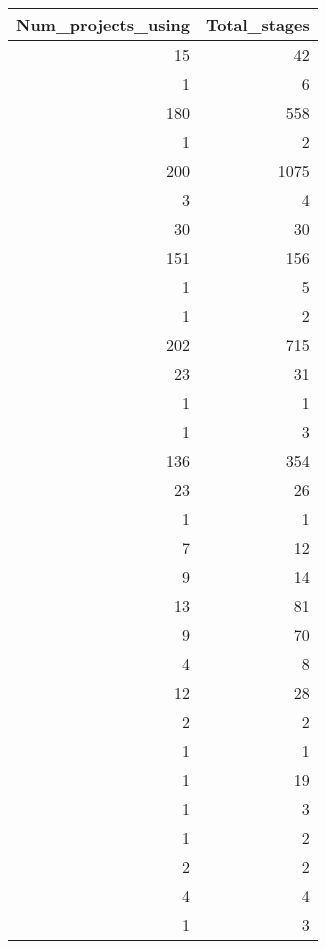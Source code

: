 \begin{tabular}{rr}
\toprule
 Num\_projects\_using &  Total\_stages \\
\midrule
                 15 &            42 \\
                  1 &             6 \\
                180 &           558 \\
                  1 &             2 \\
                200 &          1075 \\
                  3 &             4 \\
                 30 &            30 \\
                151 &           156 \\
                  1 &             5 \\
                  1 &             2 \\
                202 &           715 \\
                 23 &            31 \\
                  1 &             1 \\
                  1 &             3 \\
                136 &           354 \\
                 23 &            26 \\
                  1 &             1 \\
                  7 &            12 \\
                  9 &            14 \\
                 13 &            81 \\
                  9 &            70 \\
                  4 &             8 \\
                 12 &            28 \\
                  2 &             2 \\
                  1 &             1 \\
                  1 &            19 \\
                  1 &             3 \\
                  1 &             2 \\
                  2 &             2 \\
                  4 &             4 \\
                  1 &             3 \\

\end{tabular}
